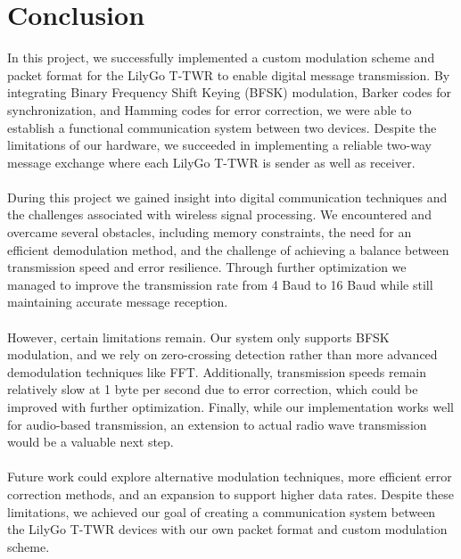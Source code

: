 \chapter{Conclusion}
In this project, we successfully implemented a custom modulation scheme and packet format for the LilyGo T-TWR to enable digital message transmission. By integrating Binary Frequency Shift Keying (BFSK) modulation, Barker codes for synchronization, and Hamming codes for error correction, we were able to establish a functional communication system between two devices. Despite the limitations of our hardware, we succeeded in implementing a reliable two-way message exchange where each LilyGo T-TWR is sender as well as receiver.
\\ \\
During this project we gained insight into digital communication techniques and the challenges associated with wireless signal processing. We encountered and overcame several obstacles, including memory constraints, the need for an efficient demodulation method, and the challenge of achieving a balance between transmission speed and error resilience. Through further optimization we managed to improve the transmission rate from 4 Baud to 16 Baud while still maintaining accurate message reception.
\\ \\
However, certain limitations remain. Our system only supports BFSK modulation, and we rely on zero-crossing detection rather than more advanced demodulation techniques like FFT. Additionally, transmission speeds remain relatively slow at 1 byte per second due to error correction, which could be improved with further optimization. Finally, while our implementation works well for audio-based transmission, an extension to actual radio wave transmission would be a valuable next step.
\\ \\
Future work could explore alternative modulation techniques, more efficient error correction methods, and an expansion to support higher data rates. Despite these limitations, we achieved our goal of creating a communication system between the LilyGo T-TWR devices with our own packet format and custom modulation scheme.